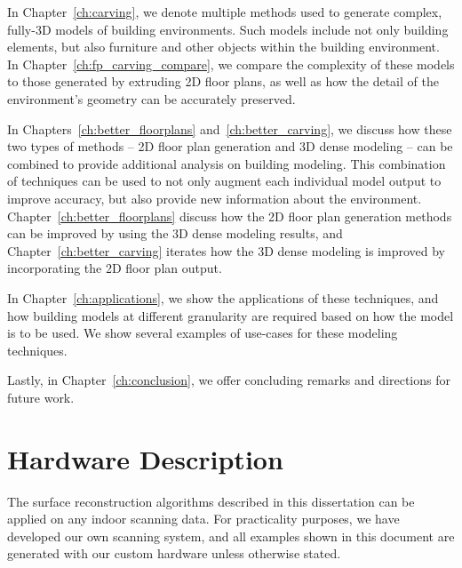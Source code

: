 \documentclass[12pt,onecolumn,oneside]{book}
\begin{document}
In Chapter~\ref{ch:carving}, we denote multiple methods used to generate complex, fully-3D models of building environments.  Such models include not only building elements, but also furniture and other objects within the building environment.  In Chapter~\ref{ch:fp_carving_compare}, we compare the complexity of these models to those generated by extruding 2D floor plans, as well as how the detail of the environment's geometry can be accurately preserved.

In Chapters~\ref{ch:better_floorplans} and~\ref{ch:better_carving}, we discuss how these two types of methods -- 2D floor plan generation and 3D dense modeling -- can be combined to provide additional analysis on building modeling.  This combination of techniques can be used to not only augment each individual model output to improve accuracy, but also provide new information about the environment.  Chapter~\ref{ch:better_floorplans} discuss how the 2D floor plan generation methods can be improved by using the 3D dense modeling results, and Chapter~\ref{ch:better_carving} iterates how the 3D dense modeling is improved by incorporating the 2D floor plan output.

In Chapter~\ref{ch:applications}, we show the applications of these techniques, and how building models at different granularity are required based on how the model is to be used.  We show several examples of use-cases for these modeling techniques.

Lastly, in Chapter~\ref{ch:conclusion}, we offer concluding remarks and directions for future work.


\chapter{Hardware Description}
\label{ch:hardware}

The surface reconstruction algorithms described in this dissertation can be applied on any indoor scanning data.  For practicality purposes, we have developed our own scanning system, and all examples shown in this document are generated with our custom hardware unless otherwise stated.
\end{document}
